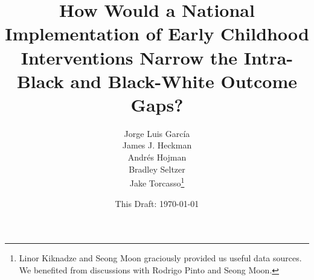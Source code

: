 

\title{How Would a National Implementation of Early Childhood Interventions Narrow the Intra-Black and Black-White Outcome Gaps?}
\author{Jorge Luis Garc\'{i}a \\
James J. Heckman \\
Andr\'{e}s Hojman\\
Bradley Seltzer \\
Jake Torcasso\thanks{Linor Kiknadze and Seong Moon graciously provided us useful data sources. We benefited from discussions with Rodrigo Pinto and Seong Moon.}}
\date{This Draft: \today}
\maketitle

\clearpage
